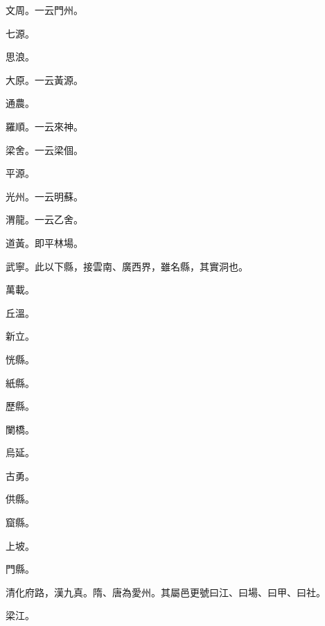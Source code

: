 \begin{pinyinscope}
 文周。一云門州。



 七源。



 思浪。



 大原。一云黃源。



 通農。



 羅順。一云來神。



 梁舍。一云梁個。



 平源。



 光州。一云明蘇。



 渭龍。一云乙舍。



 道黃。即平林場。



 武寧。此以下縣，接雲南、廣西界，雖名縣，其實洞也。



 萬載。



 丘溫。



 新立。



 恍縣。



 紙縣。



 歷縣。



 闌橋。



 烏延。



 古勇。



 供縣。



 窟縣。



 上坡。



 門縣。



 清化府路，漢九真。隋、唐為愛州。其屬邑更號曰江、曰場、曰甲、曰社。



 梁江。




\end{pinyinscope}
